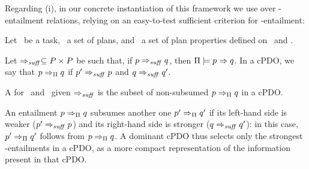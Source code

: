 Regarding (i), in our concrete instantiation of this framework we use
 over \plans-entailment relations, relying on an
easy-to-test sufficient criterion for \plans-entailment:
%
%
%

\begin{definition}\label{def:dcpdo}
Let \task\ be a task, \plans\ a set of plans, and \props\ a set of
plan properties defined on \task\ and \plans.

Let $\Rightarrow_{\mathit{suff}} \subseteq P \times P$ be such that, if $p
\Rightarrow_{\mathit{suff}} q$, then $\Pi \models p \Rightarrow q$.
%
In a cPDO, we say that $p \Rightarrow_{\Pi} q$  if $p'
\Rightarrow_{\mathit{suff}} p$ and $q \Rightarrow_{\mathit{suff}} q'$.

A  for \plans\ and \props\ given
$\Rightarrow_{\mathit{suff}}$ is the subset of non-subsumed $p \Rightarrow_{\Pi} q$
in a cPDO.
%
\end{definition}

An entailment $p \Rightarrow_{\Pi} q$ subsumes another one $p'
\Rightarrow_{\Pi} q'$ if its left-hand side is weaker ($p'
\Rightarrow_{\mathit{suff}} p$) and its right-hand side is stronger ($q
\Rightarrow_{\mathit{suff}} q'$): in this case, $p' \Rightarrow_{\Pi} q'$
follows from $p \Rightarrow_{\Pi} q$. A dominant cPDO thus selects
only the strongest \plans-entailments in a cPDO, as a more compact
representation of the information present in that cPDO.%
%

